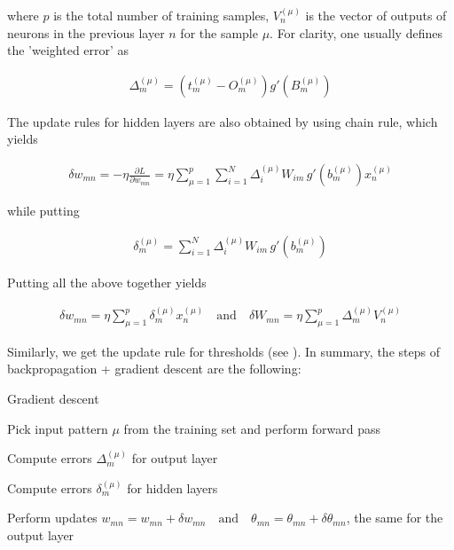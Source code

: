 \noindent where $ p $ is the total number of training samples, $ V_{n}^{(\mu)} $ is the vector of outputs of neurons in the previous layer $ n $ for the sample $ \mu $. For clarity, one usually defines the 'weighted error' as \cite{mehlig}

\begin{gather}
	\Delta_{m}^{(\mu)} = (t_{m}^{(\mu)} - O_{m}^{(\mu)})   g'(B_{m}^{(\mu)})
\end{gather}

\noindent The update rules for hidden layers are also obtained by using chain rule, which yields \cite{mehlig}

\begin{gather}
\delta w_{mn} = - \eta \frac{\partial L}{\partial w_{mn}} = \eta \sum\limits_{\mu=1}^{p} \sum\limits_{i=1}^{N}
\Delta_{i}^{(\mu)} W_{im} \, g'(b_{m}^{(\mu)}) x_{n}^{(\mu)}
\end{gather}

\noindent while putting \cite{mehlig}

\begin{gather}
\delta_{m}^{(\mu)} = \sum\limits_{i=1}^{N} \Delta_{i}^{(\mu)} W_{im} \, g'(b_{m}^{(\mu)})
\end{gather}

\noindent Putting all the above together yields \cite{mehlig}

\begin{gather}
\label{update_rule}
\delta w_{mn} = \eta \sum\limits_{\mu=1}^{p} \delta_{m}^{(\mu)} x_{n}^{(\mu)}
\quad \text{and} \quad 
\delta W_{mn} = \eta \sum\limits_{\mu=1}^{p} \Delta_{m}^{(\mu)} V_{n}^{(\mu)}	
\end{gather}

\noindent Similarly, we get the update rule for thresholds (see \cite{mehlig}). In summary, the steps of backpropagation + gradient descent are the following: \cite{mehlig}
\vspace{5mm}
\begin{algorithm}
	\caption{Gradient descent \cite{mehlig}}
	\begin{algorithmic}[1]
		\item Pick input pattern $ \mu $ from the training set and perform forward pass
		\item Compute errors $ \Delta_{m}^{(\mu)} $ for output layer
		\item Compute errors $ \delta_{m}^{(\mu)} $ for hidden layers
		\item Perform updates $w_{mn} = w_{mn} + \delta w_{mn} \quad \text{and} \quad \theta_{mn} = \theta_{mn} + \delta \theta_{mn}$, the same for the output layer
	\end{algorithmic}
\end{algorithm}

